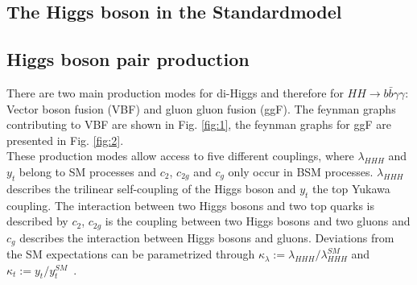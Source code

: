 \label{sec:theory}

\subsection{The Higgs boson in the Standardmodel}



\subsection{Higgs boson pair production}
\label{sec:sig_processes}

There are two main production modes for di-Higgs and therefore for $HH \rightarrow b \bar{b} \gamma \gamma$: Vector boson fusion (VBF) and gluon gluon fusion (ggF). 
The feynman graphs contributing to VBF are shown in Fig. \ref{fig:1}, the feynman graphs for ggF are presented in Fig. \ref{fig:2}. \\


These production modes allow access to five different couplings, where $\lambda_{HHH}$ and $y_t$ belong to SM processes and $c_2$, $c_{2g}$ and $c_{g}$ only occur in BSM processes.
$\lambda_{HHH}$ describes the trilinear self-coupling of the Higgs boson and $y_t$ the top Yukawa coupling. The interaction between two Higgs bosons and two top quarks is described by $c_2$,
$c_{2g}$ is the coupling between two Higgs bosons and two gluons and  $c_{g}$ describes the interaction between Higgs bosons and gluons.
Deviations from the SM expectations
can be parametrized through $\kappa_{\lambda} := \lambda_{HHH}/\lambda_{HHH}^{SM}$ and $\kappa_{t} := y_{t}/y_{t}^{SM}$~\cite{CMS:2021qbp}. 

